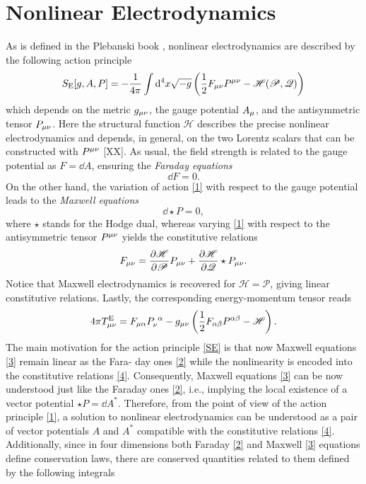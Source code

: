 \section{Nonlinear Electrodynamics}
As is defined in the Plebanski book \cite{Plebanski:1970zz}, nonlinear electrodynamics are described by the following action principle
\begin{equation}\label{1}
  S_{\rm E}[g,A,P]=-\frac{1}{4\pi }\int\dd^4 x\sqrt{-g}\left(\frac{1}{2}F_{\mu\nu }P^{\mu\nu }-\mathscr{H}(\mathscr{P},\mathscr{Q})\right)
\end{equation}
which depends on the metric $g_{\mu\nu }$, the gauge potential $A_\mu$, and the antisymmetric tensor $P_{\mu\nu }$. Here the structural function $\mathscr{H}$ describes the precise nonlinear electrodynamics and depends, in general, on the two Lorentz scalars that can be constructed with $P^{\mu\nu }$ [XX]. As usual, the field strength is related to the gauge potential as $F=\dd A$, ensuring the \textit{Faraday equations}
\begin{equation}\label{2}
  \dd F=0.
\end{equation}
On the other hand, the variation of action \eqref{1} with respect to the gauge potential leads to the \textit{Maxwell equations}
\begin{equation}\label{3}
	\dd \star P=0,
\end{equation}
where $\star$ stands for the Hodge dual, whereas varying \eqref{1} with respect to the antisymmetric tensor $P^{\mu\nu }$ yields the constitutive relations
\begin{equation}\label{4}
  F_{\mu\nu }=\pdv{\mathscr{H}}{\mathscr{P}}P_{\mu\nu }+\pdv{\mathscr{H}}{\mathscr{Q}}\star P_{\mu\nu }.
\end{equation}
Notice that Maxwell electrodynamics is recovered for $\mathscr{H}=\mathscr{P}$, giving linear constitutive relations. Lastly, the corresponding energy-momentum tensor reads
\begin{equation}\label{5}
  4\pi T_{\mu\nu }^{\rm E}=F_{\mu\alpha }P_{\nu }^{~\alpha }-g_{\mu\nu }\left(\frac{1}{2}F_{\alpha\beta }P^{\alpha\beta }-\mathscr{H}\right). 
\end{equation}
The main motivation for the action principle \eqref{SE} is that now Maxwell equations \eqref{3} remain linear as the Fara- day ones \eqref{2} while the nonlinearity is encoded into the constitutive relations \eqref{4}. Consequently, Maxwell equations \eqref{3} can be now understood just like the Faraday ones \eqref{2}, i.e., implying the local existence of a vector potential $\star P=\dd A^*$. Therefore, from the point of view of the action principle \eqref{1}, a solution to nonlinear electrodynamics can be understood as a pair of vector potentials $A$ and $A^*$ compatible with the constitutive relations \eqref{4}. Additionally, since in four dimensions both Faraday \eqref{2} and Maxwell \eqref{3} equations define conservation laws, there are conserved quantities related to them defined by the following integrals

